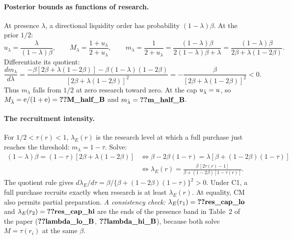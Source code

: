 \paragraph{Posterior bounds as functions of research.} At presence \(\lambda\), a directional liquidity order has
probability \((1-\lambda)\beta\). At the prior \(1/2\):
\[
u_\lambda=\frac{\lambda}{(1-\lambda)\beta},\qquad M_\lambda=\frac{1+u_\lambda}{2+u_\lambda},\qquad
m_\lambda=\frac1{2+u_\lambda}=\frac{(1-\lambda)\beta}{2(1-\lambda)\beta+\lambda}=\frac{(1-\lambda)\beta}{2\beta+\lambda(1-2\beta)} .
\]
Differentiate its quotient:
\[
\frac{dm_\lambda}{d\lambda}
=\frac{-\beta[2\beta+\lambda(1-2\beta)]-\beta(1-\lambda)(1-2\beta)}{[2\beta+\lambda(1-2\beta)]^2}
=-\frac{\beta}{[2\beta+\lambda(1-2\beta)]^2}<0.
\]
Thus \(m_\lambda\) falls from \(1/2\) at zero research toward zero. At the cap \(u_{\bar\lambda}=u\), so
\(M_{\lb}=\eu/(1+\eu)=\reg{M_half_B}\) and \(m_{\lb}=\reg{m_half_B}\).

\paragraph{The recruitment intensity.} For \(1/2<\tau(r)<1\), \(\lambda_E(r)\) is the research level at which a full purchase
just reaches the threshold: \(m_\lambda=1-\tau\). Solve:
\begin{align*}
(1-\lambda)\beta=(1-\tau)[2\beta+\lambda(1-2\beta)]&\iff\beta-2\beta(1-\tau)=\lambda[\beta+(1-2\beta)(1-\tau)]\\
&\iff\lambda_E(r)=\frac{\beta\,[2\tau(r)-1]}{\beta+(1-2\beta)[1-\tau(r)]}.
\end{align*}
The quotient rule gives \(d\lambda_E/d\tau=\beta/\{\beta+(1-2\beta)(1-\tau)\}^2>0\). Under C1, a full purchase recruits exactly when research is at least \(\lambda_E(r)\).
At equality, CM also permits partial preparation. \emph{A consistency check:} \(\lambda_E(r_1)=\reg{res_cap_lo}\) and
\(\lambda_E(r_2)=\reg{res_cap_hi}\) are the ends of the presence band in Table~2 of the paper
(\(\reg{lambda_lo_B}\), \(\reg{lambda_hi_B}\)), because both solve \(M=\tau(r_i)\) at the same \(\beta\).

